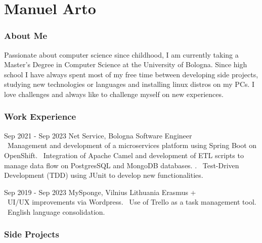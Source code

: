 \documentclass{tccv}
\begin{document}
\part{Manuel Arto}

\section{About Me}

Passionate about computer science since childhood, I am currently taking a Master's Degree in Computer Science at the University of Bologna. Since high school I have always spent most of my free time between developing side projects, studying new technologies or languages and installing linux distros on my PCs. I love challenges and always like to challenge myself on new experiences.


\section{Work Experience}

\begin{eventlist}

\item{Sep 2021 - Sep 2023}
     {Net Service, Bologna}
     {Software Engineer} \\
\textbullet~Management and development of a microservices platform using Spring Boot on OpenShift. \newline
\textbullet~Integration of Apache Camel and development of ETL scripts to manage data flow on PostgresSQL and MongoDB databases. \newline.
\textbullet~Test-Driven Development (TDD) using JUnit to develop new functionalities.

\item{Sep 2019 - Sep 2023}
     {MySponge, Vilnius Lithuania}
     {Erasmus +} \\
\textbullet~UI/UX improvements via Wordpress. \newline
\textbullet~Use of Trello as a task management tool. \newline
\textbullet~English language consolidation.
\end{eventlist}


\section{Side Projects}
\end{document}
